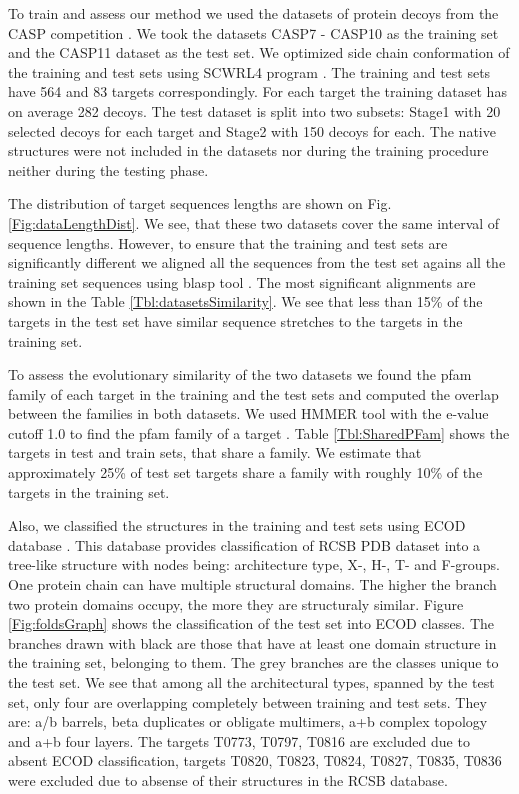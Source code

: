 To train and assess our method we used the datasets of protein decoys from the CASP competition \cite{moult2014critical}. 
We took the datasets CASP7 - CASP10 as the training set and the CASP11 dataset as the test set.
We optimized side chain conformation of the training and test sets using SCWRL4 program \cite{krivov2009improved}.
The training and test sets have 564 and 83 targets correspondingly. For each target the training dataset has 
on average 282 decoys. The test dataset is split into two subsets: Stage1 with 20 selected decoys for each target and Stage2 with 150 decoys
for each. The native structures were not included in the datasets nor during the training procedure
neither during the testing phase. 

The distribution of target sequences lengths are shown on Fig. \ref{Fig:dataLengthDist}. We see,
that these two datasets cover the same interval of sequence lengths. However, to ensure that the training 
and test sets are significantly different we aligned all the sequences from the test set agains all the training 
set sequences using blasp tool \cite{altschul1990basic}. The most significant alignments are shown in the Table \ref{Tbl:datasetsSimilarity}.
We see that less than 15\% of the targets in the test set have similar sequence stretches to the targets in the training set.

To assess the evolutionary similarity of the two datasets we found the pfam family of each target in the training and the 
test sets and computed the overlap between the families in both datasets. We used HMMER tool with the e-value cutoff 1.0 to 
find the pfam family of a target \cite{finn2016pfam}. Table \ref{Tbl:SharedPFam} shows the targets in test and train sets, that share a family. We 
estimate that approximately 25\% of test set targets share a family with roughly 10\% of the targets in the training set.

Also, we classified the structures in the training and test sets using ECOD database \cite{cheng2014ecod}. This database provides classification of 
RCSB PDB dataset \cite{berman2000protein} into a tree-like structure with nodes being: architecture type, X-, H-, T- and F-groups. One 
protein chain can have multiple structural domains. 
The higher the branch two protein 
domains occupy, the more they are structuraly similar. Figure \ref{Fig:foldsGraph} shows the classification of the test set into ECOD classes. The 
branches drawn with black are those that have at least one domain structure in the training set, belonging to them. The grey branches are the 
classes unique to the test set. We see that among all the architectural types, spanned by the test set, only four are overlapping completely
between training and test sets. They are: a/b barrels, beta duplicates or obligate multimers, a+b complex topology and a+b four layers.
The targets T0773, T0797, T0816 are excluded due to absent ECOD classification, targets T0820, T0823, T0824, T0827, T0835, T0836 were 
excluded due to absense of their structures in the RCSB database.

